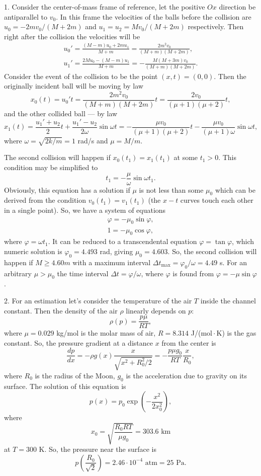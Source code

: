 \documentclass[12pt,a4paper,pdflatex]{disser}
\begin{document}
1. Consider the center-of-mass frame of reference, let the positive $Ox$ direction be antiparallel to $v_0$. In this frame the velocities of the balls before the collision are $u_0=-2mv_0/(M+2m)$ and $u_1=u_2=Mv_0/(M+2m)$ respectively. Then right after the collision the velocities will be
\begin{gather}
  u_0 '=\frac{(M-m)u_0+2mu_1}{M+m}=\frac{2m^2 v_0}{(M+m)(M+2m)},\nonumber\\
  u_1 '=\frac{2Mu_0-(M-m)u_1}{M+m}=-\frac{M(M+3m)v_0}{(M+m)(M+2m)}.\nonumber
\end{gather}
Consider the event of the collision to be the point $(x,t)=(0,0)$. Then the originally incident ball will be moving by law
$$
  x_0(t)=u_0 ' t=\frac{2m^2 v_0}{(M+m)(M+2m)}t=\frac{2v_0}{(\mu+1)(\mu+2)}t,
$$
and the other collided ball --- by law
$$
  x_1(t)=\frac{u_1 ' +u_2}{2}t+\frac{u_1 ' -u_2}{2\omega}\sin\omega t=-\frac{\mu v_0}{(\mu+1)(\mu+2)}t-\frac{\mu v_0}{(\mu+1)\omega}\sin\omega t,
$$
where $\omega=\sqrt{2k/m}=1$ rad/s and $\mu=M/m$.

The second collision will happen if $x_0(t_1)=x_1(t_1)$ at some $t_1>0$. This condition may be simplified to
$$
  t_1=-\frac{\mu}{\omega}\sin\omega t_1.
$$
Obviously, this equation has a solution if $\mu$ is not less than some $\mu_0$ which can be derived from the condition $v_0(t_1)=v_1(t_1)$ (the $x-t$ curves touch each other in a single point). So, we have a system of equations
\begin{gather}
  \varphi=-\mu_0\sin\varphi,\nonumber\\
  1=-\mu_0\cos\varphi,\nonumber
\end{gather}
where $\varphi=\omega t_1$. It can be reduced to a transcendental equation $\varphi=\tan\varphi$, which numeric solution is $\varphi_0=4.493$ rad, giving $\mu_0=4.603$. So, the second collision will happen if $M\ge 4.60m$ with a maximum interval $\Delta t_\text{max}=\varphi_0/\omega=4.49$ s. For an arbitrary $\mu>\mu_0$ the time interval $\Delta t=\varphi/\omega$, where $\varphi$ is found from $\varphi=-\mu\sin\varphi$.

2. For an estimation let's consider the temperature of the air $T$ inside the channel constant. Then the density of the air $\rho$ linearly depends on $p$:
$$
  \rho(p)=\frac{p\mu}{RT},
$$
where $\mu=0.029$ kg/mol is the molar mass of air, $R=8.314 $ J/(mol\,$\cdot$\,K) is the gas constant. So, the pressure gradient at a distance $x$ from the center is
$$
  \frac{dp}{dx}=-\rho g(x)\frac{x}{\sqrt{x^2+R_0^2/2}}=-\frac{p\mu g_0}{RT}\frac{x}{R_0},
$$
where $R_0$ is the radius of the Moon, $g_0$ is the acceleration due to gravity on its surface. The solution of this equation is
$$
  p(x)=p_0\exp\left(-\frac{x^2}{2x_0^2}\right),
$$
where
$$
  x_0=\sqrt{\frac{R_0 RT}{\mu g_0}}=303.6 \text{ km}
$$
at $T=300$ K. So, the pressure near the surface is
$$
  p\left(\frac{R_0}{\sqrt{2}}\right)=2.46\cdot 10^{-4} \text{ atm}=25 \text{ Pa}.
$$
\end{document}
